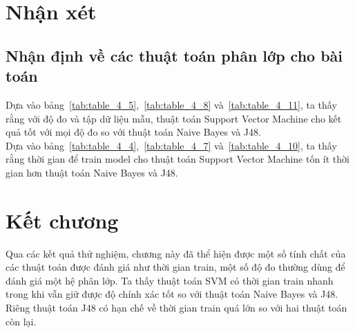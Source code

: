 \section{Nhận xét}
	\subsection{Nhận định về các thuật toán phân lớp cho bài toán}
	Dựa vào bảng~\ref{tab:table_4_5},~\ref{tab:table_4_8} và~\ref{tab:table_4_11}, ta thấy rằng với độ đo và tập dữ liệu mẫu, thuật toán Support Vector Machine cho kết quả tốt với mọi độ đo so với thuật toán Naive Bayes và J48.\\
	Dựa vào bảng~\ref{tab:table_4_4},~\ref{tab:table_4_7} và~\ref{tab:table_4_10}, ta thấy rằng thời gian để train model cho thuật toán Support Vector Machine tốn ít thời gian hơn thuật toán Naive Bayes và J48.
\section{Kết chương}
Qua các kết quả thử nghiệm, chương này đã thể hiện được một số tính chất của các thuật toán được đánh giá như thời gian train, một số độ đo thường dùng để đánh giá một hệ phân lớp. Ta thấy thuật toán SVM có thời gian train nhanh trong khi vẫn giữ được độ chính xác tốt so với thuật toán Naive Bayes và J48. Riêng thuật toán J48 có hạn chế về thời gian train quá lớn so với hai thuật toán còn lại.